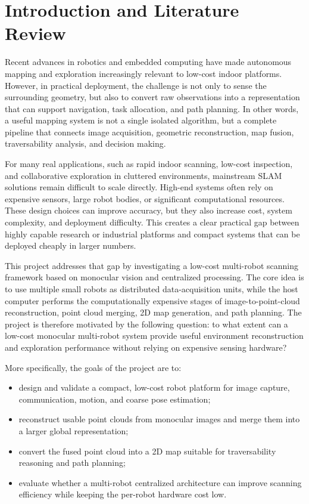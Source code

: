 \documentclass[12pt]{interim_report}
\begin{document}
\section{Introduction and Literature Review}
\label{subsec:project-background-and-motivation-junjie-ouyang}

Recent advances in robotics and embedded computing have made autonomous mapping and exploration increasingly relevant to low-cost indoor platforms. However, in practical deployment, the challenge is not only to sense the surrounding geometry, but also to convert raw observations into a representation that can support navigation, task allocation, and path planning. In other words, a useful mapping system is not a single isolated algorithm, but a complete pipeline that connects image acquisition, geometric reconstruction, map fusion, traversability analysis, and decision making.

For many real applications, such as rapid indoor scanning, low-cost inspection, and collaborative exploration in cluttered environments, mainstream SLAM solutions remain difficult to scale directly. High-end systems often rely on expensive sensors, large robot bodies, or significant computational resources. These design choices can improve accuracy, but they also increase cost, system complexity, and deployment difficulty. This creates a clear practical gap between highly capable research or industrial platforms and compact systems that can be deployed cheaply in larger numbers.

This project addresses that gap by investigating a low-cost multi-robot scanning framework based on monocular vision and centralized processing. The core idea is to use multiple small robots as distributed data-acquisition units, while the host computer performs the computationally expensive stages of image-to-point-cloud reconstruction, point cloud merging, 2D map generation, and path planning. The project is therefore motivated by the following question: to what extent can a low-cost monocular multi-robot system provide useful environment reconstruction and exploration performance without relying on expensive sensing hardware?

More specifically, the goals of the project are to:
\begin{itemize}
    \item design and validate a compact, low-cost robot platform for image capture, communication, motion, and coarse pose estimation;
    \item reconstruct usable point clouds from monocular images and merge them into a larger global representation;
    \item convert the fused point cloud into a 2D map suitable for traversability reasoning and path planning;
    \item evaluate whether a multi-robot centralized architecture can improve scanning efficiency while keeping the per-robot hardware cost low.
\end{itemize}
\end{document}
